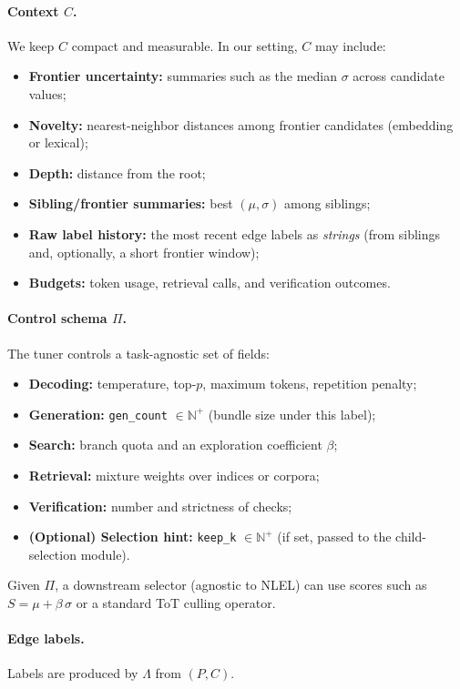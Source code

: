 \documentclass{article}
\theoremstyle{plain}
\theoremstyle{definition}
\theoremstyle{remark}
\begin{document}
\paragraph{Context $C$.}
We keep $C$ compact and measurable. In our setting, $C$ may include:
\begin{itemize}
  \item \textbf{Frontier uncertainty:} summaries such as the median $\sigma$ across candidate values;
  \item \textbf{Novelty:} nearest-neighbor distances among frontier candidates (embedding or lexical);
  \item \textbf{Depth:} distance from the root;
  \item \textbf{Sibling/frontier summaries:} best $(\mu,\sigma)$ among siblings;
  \item \textbf{Raw label history:} the most recent edge labels as \emph{strings} (from siblings and, optionally, a short frontier window);
  \item \textbf{Budgets:} token usage, retrieval calls, and verification outcomes.
\end{itemize}

\paragraph{Control schema $\Pi$.}
The tuner controls a task-agnostic set of fields:
\begin{itemize}
  \item \textbf{Decoding:} temperature, top-$p$, maximum tokens, repetition penalty;
  \item \textbf{Generation:} \texttt{gen\_count} $\in \mathbb{N}^{+}$ (bundle size under this label);
  \item \textbf{Search:} branch quota and an exploration coefficient $\beta$;
  \item \textbf{Retrieval:} mixture weights over indices or corpora;
  \item \textbf{Verification:} number and strictness of checks;
  \item \textbf{(Optional) Selection hint:} \texttt{keep\_k} $\in \mathbb{N}^{+}$ (if set, passed to the child-selection module).
\end{itemize}
Given $\Pi$, a downstream selector (agnostic to NLEL) can use scores such as $S=\mu+\beta\,\sigma$ or a standard ToT culling operator.

\paragraph{Edge labels.}
Labels are produced by $\Lambda$ from $(P,C)$.
\end{document}
